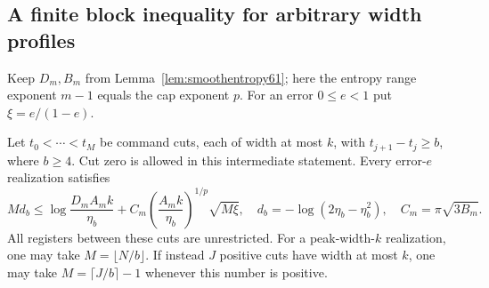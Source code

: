 \subsection{A finite block inequality for arbitrary width profiles}
Keep $D_m,B_m$ from Lemma~\ref{lem:smoothentropy61}; here the entropy
range exponent $m-1$ equals the cap exponent $p$.
For an error $0\le e<1$ put $\xi=e/(1-e)$.
\begin{theorem}\label{thm:blockbudget63}
Let $t_0<\cdots<t_M$ be command cuts, each of width at most $k$,
with $t_{j+1}-t_j\ge b$, where $b\ge4$. Cut zero is allowed in this
intermediate statement. Every error-$e$ realization satisfies
\begin{equation}\label{eq:blockbudget63}
 M d_b\le\log\frac{D_m A_m k}{\eta_b}
 +C_m\left(\frac{A_m k}{\eta_b}\right)^{1/p}\sqrt{M\xi},
 \quad d_b=-\log(2\eta_b-\eta_b^2),\quad C_m=\pi\sqrt{3B_m}.
\end{equation}
All registers between these cuts are unrestricted.
For a peak-width-$k$ realization, one may take $M=\lfloor N/b\rfloor$.
If instead $J$ positive cuts have width at most $k$, one may take
$M=\lceil J/b\rceil-1$ whenever this number is positive.
\end{theorem}
